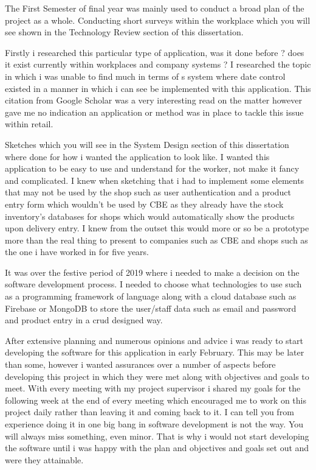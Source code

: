 The First Semester of final year was mainly used to conduct a broad plan of the project as a whole. Conducting short surveys within the workplace which you will see shown in the Technology Review section of this dissertation. 
\newline

Firstly i researched this particular type of application, was it done before ? does it exist currently within workplaces and company systems ? I researched the topic in which i was unable to find much in terms of s system where date control existed in a manner in which i can see be implemented with this application. This citation from Google Scholar \cite{nakano2006food} was a very interesting read on the matter however gave me no indication an application or method was in place to tackle this issue within retail. 
\newline

Sketches which you will see in the System Design section of this dissertation where done for how i wanted the application to look like. I wanted this application to be easy to use and understand for the worker, not make it fancy and complicated. I knew when sketching that i had to implement some elements that may not be used by the shop such as user authentication and a product entry form which wouldn't be used by CBE as they already have the stock inventory's databases for shops which would automatically show the products upon delivery entry. I knew from the outset this would more or so be a prototype more than the real thing to present to companies such as CBE and shops such as the one i have worked in for five years. 
\newline

It was over the festive period of 2019 where i needed to make a decision on the software development process. I needed to choose what technologies to use such as a programming framework of language along with a cloud database such as Firebase or MongoDB to store the user/staff data such as email and password and product entry in a crud designed way.
\newline

After extensive planning and numerous opinions and advice i was ready to start developing the software for this application in early February. This may be later than some, however i wanted assurances over a number of aspects before developing this project in which they were met along with objectives and goals to meet. With every meeting with my project supervisor i shared my goals for the following week at the end of every meeting which encouraged me to work on this project daily rather than leaving it and coming back to it. I can tell you from experience doing it in one big bang in software development is not the way. You will always miss something, even minor. That is why i would not start developing the software until i was happy with the plan and objectives and goals set out and were they attainable.

